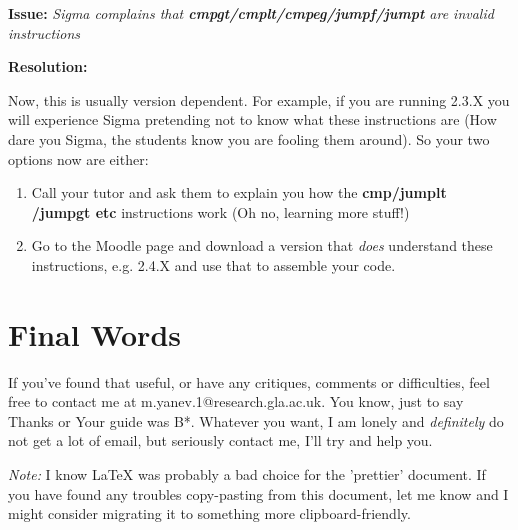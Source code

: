 \documentclass[11pt,a4paper]{article}
\begin{document}
\textbf{Issue:}
 \textit{Sigma complains that \textbf{cmpgt/cmplt/cmpeg/jumpf/jumpt} are invalid instructions}
 
\textbf{Resolution:}

Now, this is usually version dependent. For example, if you are running 2.3.X you will experience Sigma pretending not to know what these instructions are (How dare you Sigma, the students know you are fooling them around). So your two options now are either:
\begin{enumerate}
    \item Call your tutor and ask them to explain you how the \textbf{cmp/jumplt\\/jumpgt etc} instructions work (Oh no, learning more stuff!)
    \item Go to the Moodle page and download a version that \textit{does} understand these instructions, e.g. 2.4.X and use that to assemble your code.
\end{enumerate}

\section{Final Words}
 If you've found that useful, or have any critiques, comments or difficulties, feel free to contact me at m.yanev.1@research.gla.ac.uk. You know, just to say Thanks or Your guide was B*. Whatever you want, I am lonely and \textit{definitely} do not get a lot of email, but seriously contact me, I'll try and help you.
 
 \textit{Note:}
  I know LaTeX was probably a bad choice for the 'prettier' document. If you have found any troubles copy-pasting from this document, let me know and I might consider migrating it to something more clipboard-friendly.
\end{document}
